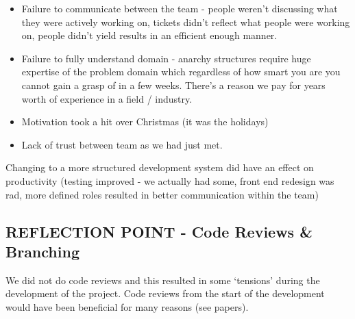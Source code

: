 \documentclass{l3proj}
\begin{document}
\begin{itemize}
\item Failure to communicate between the team - people weren’t discussing what they were actively working on, tickets didn’t reflect what people were working on, people didn’t yield results in an efficient enough manner.
\item Failure to fully understand domain - anarchy structures require huge expertise of the problem domain which regardless of how smart you are you cannot gain a grasp of in a few weeks. There’s a reason we pay for years worth of experience in a field / industry.
\item Motivation took a hit over Christmas (it was the holidays)
\item Lack of trust between team as we had just met.
\end{itemize}

Changing to a more structured development system did have an effect on productivity (testing improved - we actually had some, front end redesign was rad, more defined roles resulted in better communication within the team)


\subsection{REFLECTION POINT - Code Reviews \& Branching}
\label{sec:codereviewbranch}
We did not do code reviews and this resulted in some ‘tensions’ during the development of the project. Code reviews from the start of the development would have been beneficial for many reasons (see papers).
\end{document}
